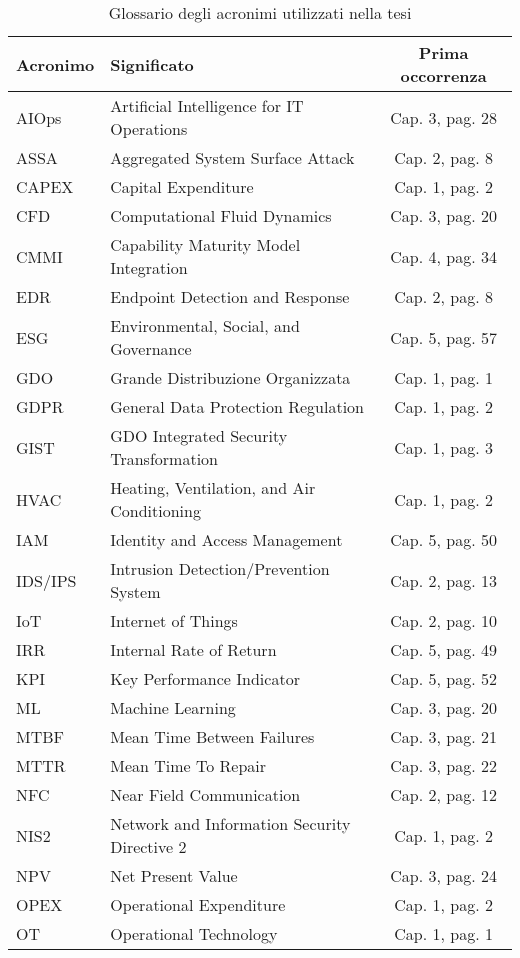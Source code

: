 \begin{table}[htbp]
\centering
\caption{Glossario degli acronimi utilizzati nella tesi}
\label{tab:glossario}
\begin{tabular}{llc}
\toprule
\textbf{Acronimo} & \textbf{Significato} & \textbf{Prima occorrenza} \\
\midrule
AIOps & Artificial Intelligence for IT Operations & Cap. 3, pag. 28 \\
ASSA & Aggregated System Surface Attack & Cap. 2, pag. 8 \\
CAPEX & Capital Expenditure & Cap. 1, pag. 2 \\
CFD & Computational Fluid Dynamics & Cap. 3, pag. 20 \\
CMMI & Capability Maturity Model Integration & Cap. 4, pag. 34 \\
EDR & Endpoint Detection and Response & Cap. 2, pag. 8 \\
ESG & Environmental, Social, and Governance & Cap. 5, pag. 57 \\
GDO & Grande Distribuzione Organizzata & Cap. 1, pag. 1 \\
GDPR & General Data Protection Regulation & Cap. 1, pag. 2 \\
GIST & GDO Integrated Security Transformation & Cap. 1, pag. 3 \\
HVAC & Heating, Ventilation, and Air Conditioning & Cap. 1, pag. 2 \\
IAM & Identity and Access Management & Cap. 5, pag. 50 \\
IDS/IPS & Intrusion Detection/Prevention System & Cap. 2, pag. 13 \\
IoT & Internet of Things & Cap. 2, pag. 10 \\
IRR & Internal Rate of Return & Cap. 5, pag. 49 \\
KPI & Key Performance Indicator & Cap. 5, pag. 52 \\
ML & Machine Learning & Cap. 3, pag. 20 \\
MTBF & Mean Time Between Failures & Cap. 3, pag. 21 \\
MTTR & Mean Time To Repair & Cap. 3, pag. 22 \\
NFC & Near Field Communication & Cap. 2, pag. 12 \\
NIS2 & Network and Information Security Directive 2 & Cap. 1, pag. 2 \\
NPV & Net Present Value & Cap. 3, pag. 24 \\
OPEX & Operational Expenditure & Cap. 1, pag. 2 \\
OT & Operational Technology & Cap. 1, pag. 1 \\

\end{tabular}
\end{table}
